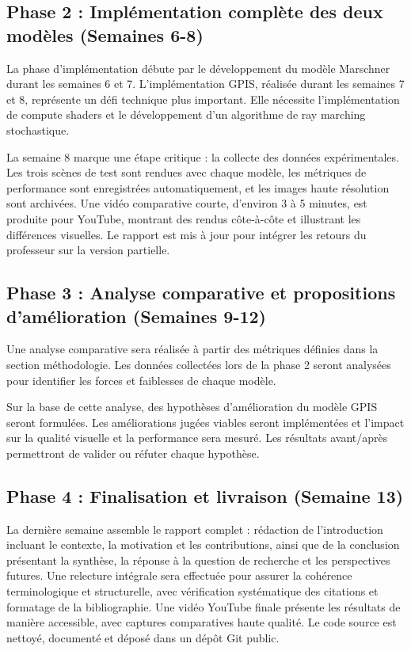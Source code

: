 \documentclass[12pt,a4paper,french]{article}
\begin{document}
\subsection{Phase 2 : Implémentation complète des deux modèles (Semaines 6-8)}

La phase d'implémentation débute par le développement du modèle Marschner durant les semaines 6 et 7. L'implémentation GPIS, réalisée durant les semaines 7 et 8, représente un défi technique plus important. Elle nécessite l'implémentation de compute shaders et le développement d'un algorithme de ray marching stochastique.

La semaine 8 marque une étape critique : la collecte des données expérimentales. Les trois scènes de test sont rendues avec chaque modèle,  les métriques de performance sont enregistrées automatiquement, et les images haute résolution sont archivées.
Une vidéo comparative courte, d'environ 3 à 5 minutes, est produite pour YouTube, montrant des rendus côte-à-côte et illustrant les différences visuelles. Le rapport est mis à jour pour intégrer les retours du professeur sur la version partielle.

\subsection{Phase 3 : Analyse comparative et propositions d'amélioration (Semaines 9-12)}

Une analyse comparative sera réalisée à partir des métriques définies dans la section méthodologie. Les données collectées lors de la phase 2 seront analysées pour identifier les forces et faiblesses de chaque modèle.

Sur la base de cette analyse, des hypothèses d'amélioration du modèle GPIS seront formulées. Les améliorations jugées viables seront implémentées et l'impact sur la qualité visuelle et la performance sera mesuré. Les résultats avant/après permettront de valider ou réfuter chaque hypothèse.

\subsection{Phase 4 : Finalisation et livraison (Semaine 13)}

La dernière semaine assemble le rapport complet : rédaction de l'introduction incluant le contexte, la motivation et les contributions, ainsi que de la conclusion présentant la synthèse, la réponse à la question de recherche et les perspectives futures. Une relecture intégrale sera effectuée pour assurer la cohérence terminologique et structurelle, avec vérification systématique des citations et formatage de la bibliographie. Une vidéo YouTube finale présente les résultats de manière accessible, avec captures comparatives haute qualité. Le code source est nettoyé, documenté et déposé dans un dépôt Git public.
\end{document}
